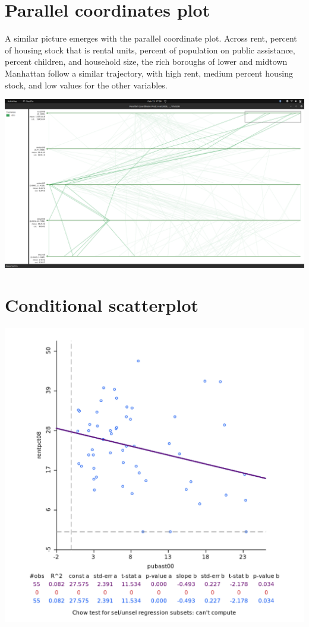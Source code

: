 \documentclass[11pt]{article}
\begin{document}
\section{Parallel coordinates plot}
\label{sec:orgbcf4058}
A similar picture emerges with the parallel coordinate plot. Across rent, percent of housing stock that is rental units, percent of population on public assistance, percent children, and household size, the rich boroughs of lower and midtown Manhattan follow a similar trajectory, with high rent, medium percent housing stock, and low values for the other variables.

\begin{center}
\includegraphics[width=.9\linewidth]{parallel_coord.png}
\end{center}

\section{Conditional scatterplot}
\label{sec:orgec5d119}
\begin{center}
\includegraphics[width=.9\linewidth]{rent_pub_ast_scatter.png}
\end{center}
\end{document}
